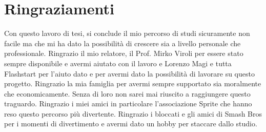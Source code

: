 \documentclass[12pt,a4paper,openright,twoside]{book}
\begin{document}

% 




\backmatter
\cleardoublepage
{}



\chapter*{Ringraziamenti}
Con questo lavoro di tesi, si conclude il mio percorso di studi
sicuramente non facile ma che mi ha dato la possibilità di crescere sia
a livello personale che professionale.  \hfill \break
Ringrazio il mio relatore, il Prof. Mirko Viroli per essere stato sempre disponibile e avermi aiutato con il lavoro
e Lorenzo Magi e tutta Flashstart per l'aiuto dato e per avermi dato la possibilità di lavorare su questo progetto.  \hfill \break
Ringrazio la mia famiglia per avermi sempre supportato sia moralmente che economicamente. Senza
di loro non sarei mai riuscito a raggiungere questo traguardo.  \hfill \break
Ringrazio i miei amici in particolare l'associazione Sprite che hanno
reso questo percorso più divertente.
Ringrazio i bloccati e gli amici di Smash Bros per i momenti di divertimento e avermi dato un hobby per
staccare dallo studio.
\end{document}

